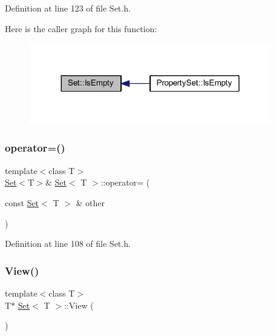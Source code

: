 Definition at line 123 of file Set.\+h.

Here is the caller graph for this function\+:
\nopagebreak
\begin{figure}[H]
\begin{center}
\leavevmode
\includegraphics[width=300pt]{class_set_ac0ef2fc243b8e89c6c77485203cde754_icgraph}
\end{center}
\end{figure}
\mbox{\label{class_set_aebe57fae183aa83c69d36d24d26234b1}} 
\subsubsection{\texorpdfstring{operator=()}{operator=()}}
{\footnotesize\ttfamily template$<$class T$>$ \\
\hyperlink{class_set}{Set}$<$T$>$\& \hyperlink{class_set}{Set}$<$ T $>$\+::operator= (\begin{DoxyParamCaption}\item[{const \hyperlink{class_set}{Set}$<$ T $>$ \&}]{other }\end{DoxyParamCaption})\hspace{0.3cm}{\ttfamily [inline]}}



Definition at line 108 of file Set.\+h.

\mbox{\label{class_set_af64cceb23979b91751faef3a05c9f698}} 
\subsubsection{\texorpdfstring{View()}{View()}}
{\footnotesize\ttfamily template$<$class T$>$ \\
T$\ast$ \hyperlink{class_set}{Set}$<$ T $>$\+::View (\begin{DoxyParamCaption}{ }\end{DoxyParamCaption})\hspace{0.3cm}{\ttfamily [inline]}}



